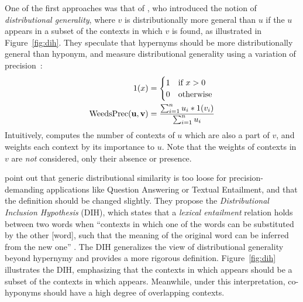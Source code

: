 One of the first approaches was that of , who
introduced the notion of \emph{distributional generality}, where $v$ is
distributionally more general than $u$ if the $u$ appears in a subset of the
contexts in which $v$ is found, as illustrated in Figure~\ref{fig:dih}.  They
speculate that hypernyms should be more distributionally general than hyponym,
and measure distributional generality using a variation of
precision~\cite{weeds:2003:emnlp,weeds:2004:coling}:
\begin{align}
  1(x) & = \begin{cases}1 & \mbox{if } x > 0\\
    0 & \mbox{otherwise}
  \end{cases}\\
  \mbox{WeedsPrec}({\mathbf{u}}, {\mathbf{v}}) & = \frac{\sum_{i=1}^n u_i * 1(v_i)}{\sum_{i=1}^n u_i}
  \label{eq:weeds}
\end{align}
Intuitively, {\WeedsPrec} computes the number of contexts of $u$ which are also
a part of $v$, and weights each context by its importance to $u$. Note that
the weights of contexts in $v$ are {\em not} considered, only their absence
or presence.

 point out that generic
distributional similarity is too loose for precision-demanding applications
like Question Answering or Textual Entailment, and that the definition should
be changed slightly. They propose the {\em Distributional Inclusion Hypothesis}
(DIH), which states that a {\em lexical entailment} relation holds between two
words when ``contexts in which one of the words can be substituted by the other
[word], such that the meaning of the original word can be inferred from the new
one'' \cite{zhitomirskygeffet:2005:acl}. The DIH generalizes the view of
distributional generality beyond hypernymy and provides a more rigorous
definition.  Figure~\ref{fig:dih} illustrates the DIH, emphasizing that the
contexts in which  appears should be a subset of the contexts in which
 appears. Meanwhile, under this interpretation, co-hyponyms should
have a high degree of overlapping contexts.

